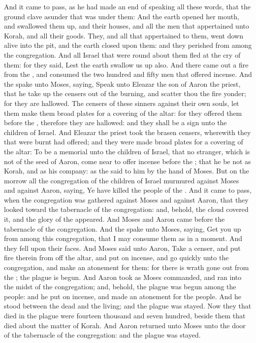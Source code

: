 \begin{biblechapter}
\verse And it came to pass, as he had made an end of speaking all these words, that the ground clave asunder that was under them:
\verse And the earth opened her mouth, and swallowed them up, and their houses, and all the men that appertained unto Korah, and all their goods.
\verse They, and all that appertained to them, went down alive into the pit, and the earth closed upon them: and they perished from among the congregation.
\verse And all Israel that were round about them fled at the cry of them: for they said, Lest the earth swallow us up also.
\verse And there came out a fire from the \LORD, and consumed the two hundred and fifty men that offered incense.
\verse And the \LORD spake unto Moses, saying,
\verse Speak unto Eleazar the son of Aaron the priest, that he take up the censers out of the burning, and scatter thou the fire yonder; for they are hallowed.
\verse The censers of these sinners against their own souls, let them make them broad plates for a covering of the altar: for they offered them before the \LORD, therefore they are hallowed: and they shall be a sign unto the children of Israel.
\verse And Eleazar the priest took the brasen censers, wherewith they that were burnt had offered; and they were made broad plates for a covering of the altar:
\verse To be a memorial unto the children of Israel, that no stranger, which is not of the seed of Aaron, come near to offer incense before the \LORD; that he be not as Korah, and as his company: as the \LORD said to him by the hand of Moses.
\verse But on the morrow all the congregation of the children of Israel murmured against Moses and against Aaron, saying, Ye have killed the people of the \LORD.
\verse And it came to pass, when the congregation was gathered against Moses and against Aaron, that they looked toward the tabernacle of the congregation: and, behold, the cloud covered it, and the glory of the \LORD appeared.
\verse And Moses and Aaron came before the tabernacle of the congregation.
\verse And the \LORD spake unto Moses, saying,
\verse Get you up from among this congregation, that I may consume them as in a moment. And they fell upon their faces.
\verse And Moses said unto Aaron, Take a censer, and put fire therein from off the altar, and put on incense, and go quickly unto the congregation, and make an atonement for them: for there is wrath gone out from the \LORD; the plague is begun.
\verse And Aaron took as Moses commanded, and ran into the midst of the congregation; and, behold, the plague was begun among the people: and he put on incense, and made an atonement for the people.
\verse And he stood between the dead and the living; and the plague was stayed.
\verse Now they that died in the plague were fourteen thousand and seven hundred, beside them that died about the matter of Korah.
\verse And Aaron returned unto Moses unto the door of the tabernacle of the congregation: and the plague was stayed.
\end{biblechapter}

